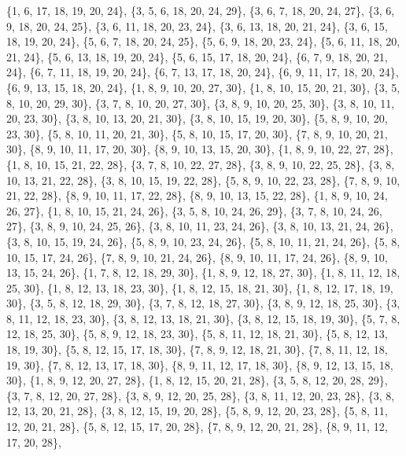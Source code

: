 \documentclass[11pt,a4paper]{article}
\begin{document}
{\{1, 6, 17, 18, 19, 20, 24\}, \{3, 5, 6, 18, 20, 24, 29\}, \{3, 6, 7, 18, 20, 24, 27\}, \{3, 6, 9, 18, 20, 24, 25\}, \{3, 6, 11, 18, 20, 23, 24\},
\{3, 6, 13, 18, 20, 21, 24\}, \{3, 6, 15, 18, 19, 20, 24\}, \{5, 6, 7, 18, 20, 24, 25\}, \{5, 6, 9, 18, 20, 23, 24\}, \{5, 6, 11, 18, 20, 21, 24\},
\{5, 6, 13, 18, 19, 20, 24\}, \{5, 6, 15, 17, 18, 20, 24\}, \{6, 7, 9, 18, 20, 21, 24\}, \{6, 7, 11, 18, 19, 20, 24\}, \{6, 7, 13, 17, 18, 20, 24\},
\{6, 9, 11, 17, 18, 20, 24\}, \{6, 9, 13, 15, 18, 20, 24\}, \{1, 8, 9, 10, 20, 27, 30\}, \{1, 8, 10, 15, 20, 21, 30\}, \{3, 5, 8, 10, 20, 29, 30\},
\{3, 7, 8, 10, 20, 27, 30\}, \{3, 8, 9, 10, 20, 25, 30\}, \{3, 8, 10, 11, 20, 23, 30\}, \{3, 8, 10, 13, 20, 21, 30\}, \{3, 8, 10, 15, 19, 20, 30\},
\{5, 8, 9, 10, 20, 23, 30\}, \{5, 8, 10, 11, 20, 21, 30\}, \{5, 8, 10, 15, 17, 20, 30\}, \{7, 8, 9, 10, 20, 21, 30\}, \{8, 9, 10, 11, 17, 20, 30\},
\{8, 9, 10, 13, 15, 20, 30\}, \{1, 8, 9, 10, 22, 27, 28\}, \{1, 8, 10, 15, 21, 22, 28\}, \{3, 7, 8, 10, 22, 27, 28\}, \{3, 8, 9, 10, 22, 25, 28\},
\{3, 8, 10, 13, 21, 22, 28\}, \{3, 8, 10, 15, 19, 22, 28\}, \{5, 8, 9, 10, 22, 23, 28\}, \{7, 8, 9, 10, 21, 22, 28\}, \{8, 9, 10, 11, 17, 22, 28\},
\{8, 9, 10, 13, 15, 22, 28\}, \{1, 8, 9, 10, 24, 26, 27\}, \{1, 8, 10, 15, 21, 24, 26\}, \{3, 5, 8, 10, 24, 26, 29\}, \{3, 7, 8, 10, 24, 26, 27\},
\{3, 8, 9, 10, 24, 25, 26\}, \{3, 8, 10, 11, 23, 24, 26\}, \{3, 8, 10, 13, 21, 24, 26\}, \{3, 8, 10, 15, 19, 24, 26\}, \{5, 8, 9, 10, 23, 24, 26\},
\{5, 8, 10, 11, 21, 24, 26\}, \{5, 8, 10, 15, 17, 24, 26\}, \{7, 8, 9, 10, 21, 24, 26\}, \{8, 9, 10, 11, 17, 24, 26\}, \{8, 9, 10, 13, 15, 24, 26\},
\{1, 7, 8, 12, 18, 29, 30\}, \{1, 8, 9, 12, 18, 27, 30\}, \{1, 8, 11, 12, 18, 25, 30\}, \{1, 8, 12, 13, 18, 23, 30\}, \{1, 8, 12, 15, 18, 21, 30\},
\{1, 8, 12, 17, 18, 19, 30\}, \{3, 5, 8, 12, 18, 29, 30\}, \{3, 7, 8, 12, 18, 27, 30\}, \{3, 8, 9, 12, 18, 25, 30\}, \{3, 8, 11, 12, 18, 23, 30\},
\{3, 8, 12, 13, 18, 21, 30\}, \{3, 8, 12, 15, 18, 19, 30\}, \{5, 7, 8, 12, 18, 25, 30\}, \{5, 8, 9, 12, 18, 23, 30\}, \{5, 8, 11, 12, 18, 21, 30\},
\{5, 8, 12, 13, 18, 19, 30\}, \{5, 8, 12, 15, 17, 18, 30\}, \{7, 8, 9, 12, 18, 21, 30\}, \{7, 8, 11, 12, 18, 19, 30\}, \{7, 8, 12, 13, 17, 18, 30\},
\{8, 9, 11, 12, 17, 18, 30\}, \{8, 9, 12, 13, 15, 18, 30\}, \{1, 8, 9, 12, 20, 27, 28\}, \{1, 8, 12, 15, 20, 21, 28\}, \{3, 5, 8, 12, 20, 28, 29\},
\{3, 7, 8, 12, 20, 27, 28\}, \{3, 8, 9, 12, 20, 25, 28\}, \{3, 8, 11, 12, 20, 23, 28\}, \{3, 8, 12, 13, 20, 21, 28\}, \{3, 8, 12, 15, 19, 20, 28\},
\{5, 8, 9, 12, 20, 23, 28\}, \{5, 8, 11, 12, 20, 21, 28\}, \{5, 8, 12, 15, 17, 20, 28\}, \{7, 8, 9, 12, 20, 21, 28\}, \{8, 9, 11, 12, 17, 20, 28\},
}
\end{document}
